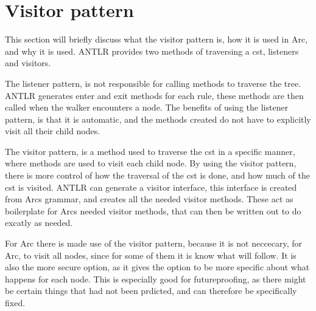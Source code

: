 \section{Visitor pattern}\label{sec:visitorpattern}
This section will briefly discuss what the visitor pattern is, how it is used in Arc, and why it is used. ANTLR provides two methods of traversing a \gls{cst}, listeners and visitors. 

The listener pattern, is not responsible for calling methods to traverse the tree. ANTLR generates enter and exit methods for each rule, these methods are then called when the walker encounters a node. The benefits of using the listener pattern, is that it is automatic, and the methods created do not have to explicitly visit all their child nodes\cite{Parr2014}. 

The visitor pattern, is a method used to traverse the \gls{cst} in a specific manner, where methods are used to visit each child node. By using the visitor pattern, there is more control of how the traversal of the \gls{cst} is done, and how much of the \gls{cst} is visited. ANTLR can generate a visitor interface, this interface is created from Arcs grammar, and creates all the needed visitor methods. These act as boilerplate for Arcs needed visitor methods, that can then be written out to do excatly as needed\cite{Parr2014}. 

For Arc there is made use of the visitor pattern, because it is not neccecary, for Arc, to visit all nodes, since for some of them it is know what will follow. It is also the more secure option, as it gives the option to be more specific about what happens for each node. This is especially good for futureproofing, as there might be certain things that had not been prdicted, and can therefore be specifically fixed.




